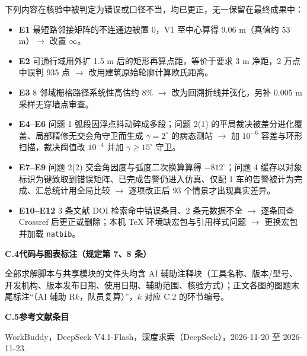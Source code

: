 {下列内容在核验中被判定为错误或口径不当，均已更正，无一保留在最终成果中：
\begin{itemize}[leftmargin=1.6em]
  \item \textbf{E1} 最短路邻接矩阵的不连通边被置 0，V1 至中心算得 9.06 m（真值约 53 m）$\rightarrow$ 改置 $\infty$。
  \item \textbf{E2} 可通行域用外扩 1.5 m 后的矩形再算点距，等价于要求 3 m 净距，2 万点中误判 935 点 $\rightarrow$ 改用建筑原始轮廓计算欧氏距离。
  \item \textbf{E3} 8 邻域栅格路径系统性高估约 8\% $\rightarrow$ 改为回溯折线并弦化，另补 0.005 m 采样无穿墙点审查。
  \item \textbf{E4--E6} 问题 1 弧段因浮点抖动碎成多段；问题 2(1) 的平局裁决被差分进化覆盖、局部精修无交会角守卫而生成 $\gamma=2^\circ$ 的病态测站 $\rightarrow$ 加 $10^{-6}$ 容差与环形扫描，裁决阈值改 $10^{-4}$ 并加 $\gamma\ge15^\circ$ 守卫。
  \item \textbf{E7--E9} 问题 2(2) 交会角因度与弧度二次换算算得 $-812^\circ$；问题 4 缓存以对象标识为键致取到错误矩阵、已完成告警仍进入仿真、仅配 1 车的告警被计为完成、汇总统计用全局比较 $\rightarrow$ 逐项改正后 93 个情景才出现真实差异。
  \item \textbf{E10--E12} 3 条文献 DOI 检索命中错误条目、2 条元数据不全 $\rightarrow$ 逐条回查 Crossref 后更正或删除；本机 \TeX{} 环境缺宏包与引用样式问题 $\rightarrow$ 更换宏包并加载 \texttt{natbib}。
\end{itemize}

\vspace{3pt}
\noindent\textbf{C.4\quad 代码与图表标注（规定第 7、8 条）}

全部求解脚本与共享模块的文件头均含 AI 辅助注释块（工具名称、版本/型号、开发机构、版本发布日期、使用日期、辅助范围、核验方式）；正文各图的图题末尾标注“（AI 辅助 R$k$，队员复算）”，$k$ 对应 C.2 的环节编号。

\vspace{3pt}
\noindent\textbf{C.5\quad 参考文献条目}

\noindent [13] WorkBuddy，DeepSeek-V4.1-Flash，深度求索（DeepSeek），2026-11-20 至 2026-11-23.
\par}
